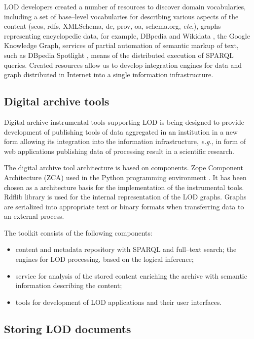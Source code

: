 \documentclass[conference,a4paper]{IEEEtran}
\begin{document}
LOD developers created a number of resources to discover domain vocabularies, including a set of base--level vocabularies for describing various aspects of the content (scos, rdfs, XMLSchema, dc, prov, oa, schema.org, \emph{etc}.), graphs representing encyclopedic data, for example, DBpedia \cite{b3} and Wikidata \cite{b4}, the Google Knowledge Graph, services of partial automation of semantic markup of text, such as DBpedia Spotlight \cite{b5}, means of the distributed execution of SPARQL queries.  Created resources allow us to develop integration engines for data and graph distributed in Internet into a single information infrastructure.

\subsection{Digital archive tools}

Digital archive instrumental tools supporting LOD is being designed to provide development of publishing tools of data aggregated in an institution in a new form allowing its integration into the information infrastructure, \emph{e.g.}, in form of web applications publishing data of processing result in a scientific research.

The digital archive tool architecture is based on components. Zope Component Architecture (ZCA) \cite{b6} used in the Python programming environment \cite{b7}.  It has been chosen as a architecture basis for the implementation of the instrumental tools.  Rdflib library is used for the internal representation of the LOD graphs.  Graphs are serialized into appropriate text or binary formats when transferring data to an external process.

The toolkit consists of the following components:
\begin{itemize}
\item content and metadata repository with SPARQL and full--text search; the engines for LOD processing, based on the logical inference;
\item service for analysis of the stored content enriching the archive with semantic information describing the content;
\item tools for development of LOD applications and their user interfaces.
\end{itemize}

\subsection{Storing LOD documents}
\end{document}

